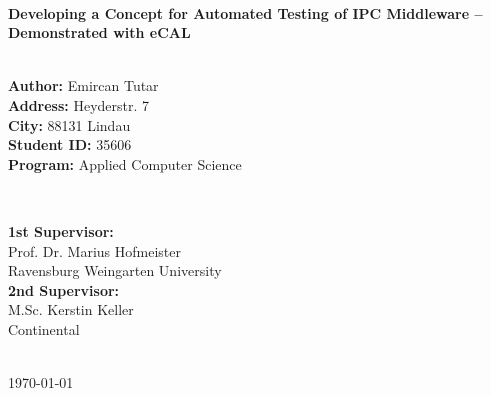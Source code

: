 \documentclass[a4paper,12pt,singlespacing]{article}
\begin{document}
\begin{titlepage}
	
	\HRule \\[0.4cm]
	{ \huge \bfseries Developing a Concept for Automated Testing of IPC Middleware – Demonstrated with eCAL}\\[0.4cm] %
	\HRule \\[1.5cm]
	
	\hspace*{0.40cm}
	\begin{minipage}{0.5\textwidth}
		\begin{flushleft}\fontsize{11pt}{14pt}\selectfont
			\textbf{Author:} Emircan Tutar\\[4pt]
			\textbf{Address:} Heyderstr. 7\\[4pt]
			\textbf{City:} 88131 Lindau\\[7pt]
			\textbf{Student ID:} 35606\\[4pt]
			\textbf{Program:} Applied Computer Science\\[4pt]
		\end{flushleft}
	\end{minipage}
	~
	\begin{minipage}{0.43\textwidth}
		\begin{flushleft} \fontsize{11pt}{14pt}\selectfont
			\textbf{1st Supervisor:} \\[2pt]
			Prof. Dr. Marius Hofmeister \\
			Ravensburg Weingarten University \\[10pt]
			\textbf{2nd Supervisor:} \\[2pt]
			M.Sc. Kerstin Keller \\
			Continental\\[7pt]
		\end{flushleft}
	\end{minipage}\\[2cm]
	
	
	{\large \today}\\[0cm] %
	
	\vfill %
	
	
\end{titlepage}
\end{document}
